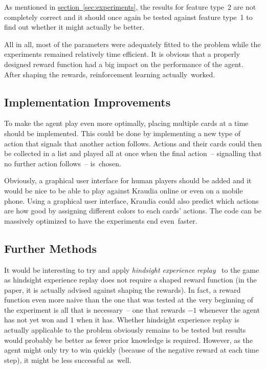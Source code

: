 \documentclass[a4paper,titlepage]{article}
\begin{document}
As mentioned in \hyperref[sec:experiments]{section~\ref*{sec:experiments}}, the results for feature type~2 are not completely correct and it should once again be tested against feature type~1 to find out whether it might actually be better.

All in all, most of the parameters were adequately fitted to the problem while the experiments remained relatively time efficient. It is obvious that a properly designed reward function had a big impact on the performance of the agent. After shaping the rewards, reinforcement learning actually~worked.

\subsection{Implementation Improvements}
\label{sec:improvements}

To make the agent play even more optimally, placing multiple cards at a time should be implemented. This could be done by implementing a new type of action that signals that another action follows. Actions and their cards could then be collected in a list and played all at once when the final action~-- signalling that no further action follows~-- is~chosen.

Obviously, a graphical user interface for human players should be added and it would be nice to be able to play against Kraudia online or even on a mobile phone. Using a graphical user interface, Kraudia could also predict which actions are how good by assigning different colors to each cards' actions. The code can be massively optimized to have the experiments end even~faster.

\subsection{Further Methods}

It would be interesting to try and apply \emph{hindsight experience replay}~\cite{her} to the game as hindsight experience replay does not require a shaped reward function (in the paper, it is actually advised against shaping the rewards). In fact, a reward function even more naive than the one that was tested at the very beginning of the experiment is all that is necessary~-- one that rewards $-1$ whenever the agent has not yet won and 1 when it has. Whether hindsight experience replay is actually applicable to the problem obviously remains to be tested but results would probably be better as fewer prior knowledge is required. However, as the agent might only try to win quickly (because of the negative reward at each time step), it might be less successful as~well.
\end{document}
